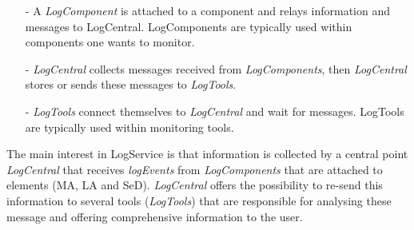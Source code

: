 \begin{itemize}
 \item[-] A \textit{LogComponent} is attached to a component and relays
   information and messages to LogCentral.  LogComponents are typically used
   within components one wants to monitor.
 \item[-] \textit{LogCentral} collects messages received from
   \textit{LogComponents}, then \textit{LogCentral} stores or sends these
   messages to \textit{LogTools}.
 \item[-] \textit{LogTools} connect themselves to \textit{LogCentral} and  wait
   for messages.  LogTools are typically used within monitoring tools.
\end{itemize}
The main interest in LogService is that information is collected by a central
point \textit{LogCentral} that receives \textit{logEvents} from
\textit{LogComponents} that are attached to \diet elements (MA, LA and
SeD). \textit{LogCentral} offers the possibility to re-send this information to
several tools (\textit{LogTools}) that are responsible for analysing these
message and offering comprehensive information to the user.\\

